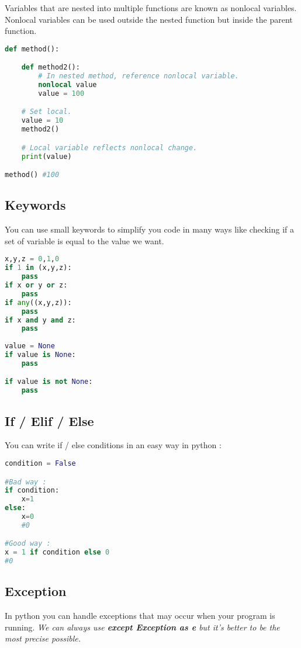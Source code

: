 \documentclass[a4paper, 12pt, titlepage]{scrartcl} %
\begin{document}
Variables that are nested into multiple functions are known as nonlocal variables. \\
Nonlocal variables can be used outside the nested function but inside the parent function.
\begin{lstlisting}[language=Python]
def method():

    def method2():
        # In nested method, reference nonlocal variable.
        nonlocal value
        value = 100

    # Set local.
    value = 10
    method2()

    # Local variable reflects nonlocal change.
    print(value)

method() #100
\end{lstlisting} \vspace{5mm}

\subsection{Keywords}
\label{subsec:Keyword}
You can use small keywords to simplify you code in many ways like checking if a set of variable is equal to the value we want.
\begin{lstlisting}[language=Python]
x,y,z = 0,1,0
if 1 in (x,y,z):
    pass
if x or y or z:
    pass
if any((x,y,z)):
    pass
if x and y and z:
    pass
    
value = None
if value is None:
    pass

if value is not None:
    pass
\end{lstlisting} \vspace{5mm}

\subsection{If / Elif / Else}
\label{IEE}
You can write if / else conditions in an easy way in python :
\begin{lstlisting}[language=Python]
condition = False

#Bad way :
if condition:
	x=1
else:
	x=0
	#0

#Good way :
x = 1 if condition else 0
#0
\end{lstlisting} \vspace{5mm}

\subsection{Exception}
In python you can handle exceptions that may occur when your program is running. \textit{We can always use \textbf{except Exception as e} but it's better to be the most precise possible.}
\end{document}
